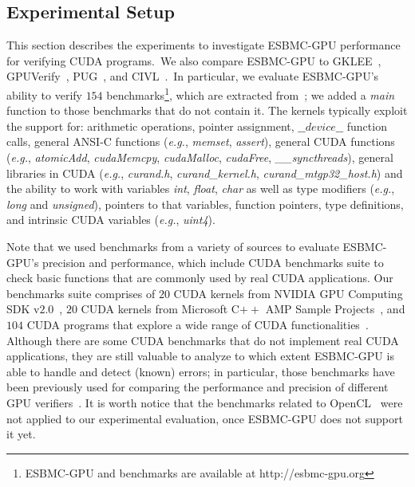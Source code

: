 \documentclass[times, doublespace]{cpeauth}
\begin{document}
\subsection{Experimental Setup}
\vspace{-2pt}
\label{sec:PlanejamentoeDesenvolvimento}

This section describes the experiments to investigate ESBMC-GPU performance for verifying CUDA programs.\
We also compare ESBMC-GPU to GKLEE~\cite{Li:2012}, GPUVerify~\cite{betts:2012}, PUG~\cite{Li:2010}, and CIVL~\cite{civl:2015}.\ In particular, we evaluate ESBMC-GPU's ability to verify $154$ benchmarks\footnote{ESBMC-GPU and benchmarks are available at http://esbmc-gpu.org}, which are extracted from~\cite{cuda:2012,betts:2012,cudaproguide:2015}; we added a \textit{main} function to those benchmarks that do not contain it. The kernels typically exploit the support for:  arithmetic operations, pointer assignment, $\_\_device\_\_$ function calls, general ANSI-C functions ({\it e.g.}, \textit{memset}, \textit{assert}), general CUDA functions ({\it e.g.}, \textit{atomicAdd}, \textit{cudaMemcpy}, \textit{cudaMalloc}, \textit{cudaFree}, \textit{\_\_syncthreads}), general libraries in CUDA ({\it e.g.}, \textit{curand.h}, \textit{curand\_kernel.h}, \textit{curand\_mtgp32\_host.h}) and the ability to work with variables \textit{int}, \textit{float}, \textit{char} as well as type modifiers ({\it e.g.}, \textit{long} and \textit{unsigned}), pointers to that variables, function pointers, type definitions, and intrinsic CUDA variables ({\it e.g.}, \textit{uint4}). 

Note that we used benchmarks from a variety of sources to evaluate ESBMC-GPU's precision and performance, which include CUDA benchmarks suite to check basic functions that are commonly used by real CUDA applications. Our benchmarks suite comprises of $20$ CUDA kernels from NVIDIA GPU Computing SDK v$2$.$0$~\cite{toolkit:2015}, $20$ CUDA kernels from Microsoft C$++$ AMP Sample Projects~\cite{microsoft:2012}, and $104$ CUDA programs that explore a wide range of CUDA functionalities~\cite{cuda:2012,cudaproguide:2015}. Although there are some CUDA benchmarks that do not implement real CUDA applications, they are still valuable to analyze to which extent ESBMC-GPU is able to handle and detect (known) errors; in particular, those benchmarks have been previously used for comparing the performance and precision of different GPU verifiers~\cite{betts:2012}. It is worth notice that the benchmarks related to OpenCL~\cite{Khronos:2011} were not applied to our experimental evaluation, once ESBMC-GPU does not support it yet.
\end{document}
